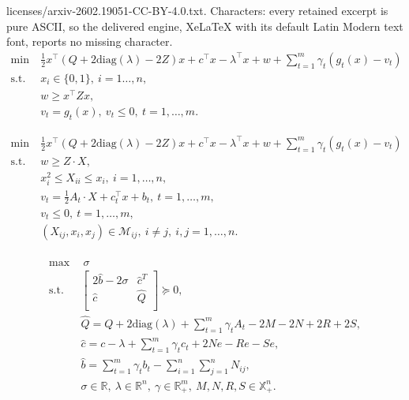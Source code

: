 \documentclass[10pt,a4paper]{amsart}
\begin{document}
licenses/arxiv-2602.19051-CC-BY-4.0.txt. Characters: every retained excerpt is pure ASCII, so the delivered engine, XeLaTeX with its default Latin Modern text font, reports no missing character.
\begin{equation}\label{QNRE}\tag{QNRE}
	\begin{aligned}
		\min ~&\frac{1}{2}x^\top(Q+2\textrm{diag}(\lambda)-2Z)x+c^\top x-\lambda^\top x+w+\sum_{t=1}^m \gamma_t \left(g_t(x)-v_t\right)\\%
		\textrm{s.t.}~&x_i \in \{0,1\},~i=1\ldots,n,\\
		&w\geq x^\top Z x,\\
		& v_t= g_t(x),~v_t\leq 0,~t=1,\ldots,m.
	\end{aligned}
\end{equation}

\begin{equation}\label{QCRE-MCR}
	\begin{aligned}
		\min ~&\frac{1}{2}x^\top(Q+2\textrm{diag}(\lambda)-2Z)x+c^\top x-\lambda^\top x+w+\sum_{t=1}^m \gamma_t \left(g_t(x)-v_t\right)\\
		\textrm{s.t.}~ &w\geq Z\cdot X,\\
		&x_i^2\leq X_{ii} \leq x_i,~i=1,\ldots,n,\\
		& v_t= \frac{1}{2}A_t \cdot X+ c_t^\top x+b_t,~t=1,\ldots,m,\\
		&v_t\leq 0,~t=1,\ldots,m,\\
		&(X_{ij},x_i,x_j)\in \mathcal{M}_{ij}, ~i\neq j, ~i,j=1,\ldots,n.\\
	\end{aligned}
\end{equation}

\begin{equation}\label{QNR-dual1}
	\begin{aligned}
		\max ~&~ \sigma \\
		\mbox{s.t.} ~&\begin{bmatrix}
			2\hat{b}-2\sigma &\hat{c}^T\\
			\hat{c} ~&\hat{Q} \\
		\end{bmatrix}\succeq 0,\\
		&\hat{Q}=Q+2\textrm{diag}(\lambda)+\sum_{t=1}^m\gamma_t A_t-2M-2N+2R+2S,\\
		&\hat{c}=c-\lambda+\sum_{t=1}^m \gamma_t c_t+2Ne-Re-Se,\\
		&\hat{b}=\sum_{t=1}^m \gamma_t b_t-\sum_{i=1}^n\sum_{j=1}^n N_{ij},\\
		&\sigma\in\mathbb{R},~\lambda\in\mathbb{R}^n,~\gamma\in\mathbb{R}^m_+,~M,N,R,S\in\mathbb{X}_+^n.
	\end{aligned}
\end{equation}
\end{document}
